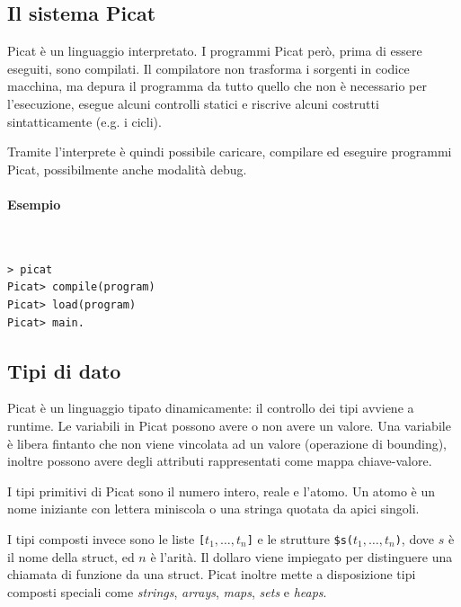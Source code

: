 \documentclass[12pt,a4paper,openright]{book} %
\begin{document}
\subsection{Il sistema Picat}
\label{sec:picat_base_system}

Picat è un linguaggio interpretato. I programmi Picat però, prima di essere eseguiti, sono compilati. Il compilatore non trasforma i sorgenti in codice macchina, ma depura il programma da tutto quello che non è necessario per l'esecuzione, esegue alcuni controlli statici e riscrive alcuni costrutti sintatticamente (e.g. i cicli).

Tramite l'interprete è quindi possibile caricare, compilare ed eseguire programmi Picat, possibilmente anche modalità debug.

\paragraph{Esempio}\
\begin{verbatim}
> picat
Picat> compile(program)
Picat> load(program)
Picat> main.
\end{verbatim}

\subsection{Tipi di dato}
\label{sec:picat_base_datatype}

Picat è un linguaggio tipato dinamicamente: il controllo dei tipi avviene a runtime. Le variabili in Picat possono avere o non avere un valore. Una variabile è libera fintanto che non viene vincolata ad un valore (operazione di bounding), inoltre possono avere degli attributi rappresentati come mappa chiave-valore.

I tipi primitivi di Picat sono il numero intero, reale e l'atomo. Un atomo è un nome iniziante con lettera miniscola o una stringa quotata da apici singoli.

I tipi composti invece sono le liste \verb|[|$t_1, \ldots, t_n$\verb|]| e le strutture \verb|$s(|$t_1, \ldots, t_n$\verb|)|, dove $s$ è il nome della struct, ed $n$ è l'arità. Il dollaro viene impiegato per distinguere una chiamata di funzione da una struct. Picat inoltre mette a disposizione tipi composti speciali come \emph{strings}, \emph{arrays}, \emph{maps}, \emph{sets} e \emph{heaps}.
\end{document}
